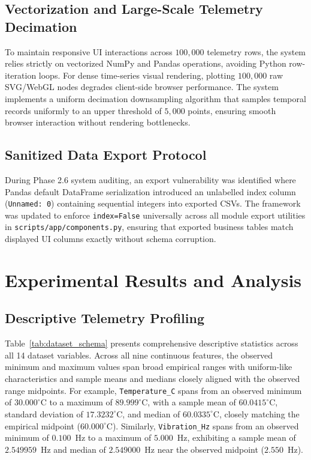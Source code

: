 \documentclass[journal]{IEEEtran}
\begin{document}
\subsection{Vectorization and Large-Scale Telemetry Decimation}
To maintain responsive UI interactions across $100{,}000$ telemetry rows, the system relies strictly on vectorized NumPy and Pandas operations, avoiding Python row-iteration loops. For dense time-series visual rendering, plotting $100{,}000$ raw SVG/WebGL nodes degrades client-side browser performance. The system implements a uniform decimation downsampling algorithm that samples temporal records uniformly to an upper threshold of $5{,}000$ points, ensuring smooth browser interaction without rendering bottlenecks.

\subsection{Sanitized Data Export Protocol}
During Phase 2.6 system auditing, an export vulnerability was identified where Pandas default DataFrame serialization introduced an unlabelled index column (\texttt{Unnamed: 0}) containing sequential integers into exported CSVs. The framework was updated to enforce \texttt{index=False} universally across all module export utilities in \texttt{scripts/app/components.py}, ensuring that exported business tables match displayed UI columns exactly without schema corruption.

\section{Experimental Results and Analysis}
\label{sec:results}

\subsection{Descriptive Telemetry Profiling}
Table~\ref{tab:dataset_schema} presents comprehensive descriptive statistics across all 14 dataset variables. Across all nine continuous features, the observed minimum and maximum values span broad empirical ranges with uniform-like characteristics and sample means and medians closely aligned with the observed range midpoints. For example, \texttt{Temperature\_C} spans from an observed minimum of $30.000^\circ\text{C}$ to a maximum of $89.999^\circ\text{C}$, with a sample mean of $60.0415^\circ\text{C}$, standard deviation of $17.3232^\circ\text{C}$, and median of $60.0335^\circ\text{C}$, closely matching the empirical midpoint ($60.000^\circ\text{C}$). Similarly, \texttt{Vibration\_Hz} spans from an observed minimum of $0.100$~Hz to a maximum of $5.000$~Hz, exhibiting a sample mean of $2.549959$~Hz and median of $2.549000$~Hz near the observed midpoint ($2.550$~Hz).
\end{document}
